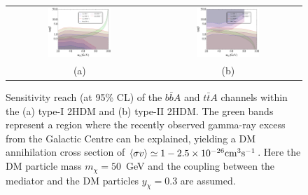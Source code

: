 \documentclass[preprintnumbers,superscriptaddress,nofootinbib,aps,prd,floatfix]{revtex4}
\begin{document}
\begin{figure}[htbp]
\begin{center}
\begin{tabular}{cc}
\includegraphics[width=0.45\textwidth,natwidth=610,natheight=642]{Figures/pheno/plot_reach1_2HDM} &
\includegraphics[width=0.45\textwidth,natwidth=610,natheight=642]{Figures/pheno/plot_reach2_2HDM} \\
(a) & (b) \\
\end{tabular}
\caption{Sensitivity reach (at 95\% CL) of the $b\bar {b} A$ and $t\bar{t}A$ channels within the (a) type-I 2HDM and (b) type-II 2HDM. The green bands represent a region where the recently observed gamma-ray excess from the Galactic Centre can be explained, yielding a DM annihilation cross section of $\langle \sigma v \rangle  \simeq 1-2.5 \times 10^{-26} {\rm cm}^3 {\rm s}^{-1}$. Here the DM particle mass $m_{\chi}=50$~GeV and the coupling between the mediator and the DM particles $y_\chi= 0.3$ are assumed.  }
\label{fig:reach_2HDM} 
\end{center}
\end{figure}
\end{document}
